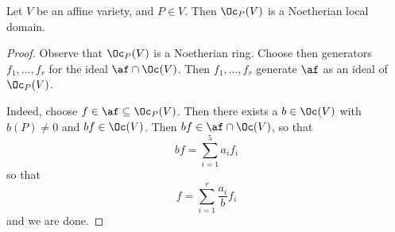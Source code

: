 \begin{proposition}\label{proposition_2.3.7}
  Let $V$ be an affine variety, and  $P \in V$. Then $\Oc_P(V)$ is a
  Noetherian local domain.
\end{proposition}
\begin{proof}
  Observe that $\Oc_P(V)$ is a Noetherian ring. Choose then generators
  $f_1, \dots, f_r$ for the ideal $\af \cap \Oc(V)$. Then $f_1,
  \dots, f_r$ generate $\af$ as an ideal of  $\Oc_P(V)$.

  Indeed, choose $f \in \af \subseteq \Oc_P(V)$. Then there exists a
  $b \in \Oc(V)$ with $b(P) \neq 0$ and $bf \in \Oc(V)$. Then $bf \in
  \af \cap \Oc(V)$, so that
  \begin{equation*}
    bf=\sum_{i=1}^5{a_if_i}
  \end{equation*}
  so that
  \begin{equation*}
    f=\sum_{i=1}^r{\frac{a_i}{b}f_i}
  \end{equation*}
  and we are done.
\end{proof}
